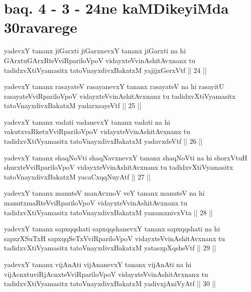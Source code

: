 \section*{baq. 4 - 3 - 24ne kaMDikeyiMda 30ravarege}

\begin{shl}
yadevxY tananx jiGarxti jiGarxnevxY tananx jiGarxti na hi GArxtuGArxRteVviRpariloVpoV vidayxteV\s vinAshitAvxnanx tu tadidxvXtiVyamasitx tatoV\s nayxdivxBakatxM yajijxGerxVtf || 24 ||
\end{shl}

\begin{shl}
yadevxY tananx rasayateV rasayanevxY tananx rasayateV na hi rasayitU rasayateVviRpariloVpoV vidayxteV\s vinAshitAvxnanx tu tadidxvXtiVyamasitx tatoV\s nayxdivxBakatxM yadarxsayeVtf || 25 ||
\end{shl}

\begin{shl}
yadevxY tananx vadati vadanevxY tananx vadati na hi vakutxvaRketxVviRpariloVpoV vidayxteV\s vinAshitAvxnanx tu tadidxvXtiVyamasitx tatoV\s nayxdivxBakatxM yadavxdeVtf || 26 ||
\end{shl}

\begin{shl}
yadevxY tananx shaqNoVti shaqNavxnevxY tananx shaqNoVti na hi shorxVtuH shurxteVviRpariloVpoV vidayxteV\s vinAshitAvxnanx tu tadidxvXtiVyamasitx tatoV\s nayxdivxBakatxM yacaCxqqNuyAtf || 27 ||
\end{shl}

\begin{shl}
yadevxY tananx manuteV manAvxnoV veY tananx manuteV na hi manutxmaRteVviRpariloVpoV vidayxteV\s vinAshitAvxnanx tu tadidxvXtiVyamasitx tatoV\s nayxdivxBakatxM yanamxnivxVta || 28 ||
\end{shl}

\begin{shl}
yadevxY tananx sapxqqshati sapxqqshanevxY tananx sapxqqshati na hi sapxrXSuTxH sapxqqSeTxVviRpariloVpoV vidayxteV\s vinAshitAvxnanx tu tadidxvXtiVyamasitx tatoV\s nayxdivxBakatxM yatasxpXqsheVtf || 29 ||
\end{shl}

\begin{shl}
yadevxY tananx vijAnAti vijAnanevxY tananx vijAnAti na hi vijAcnxtuviRjAcnxteVviRpariloVpoV vidayxteV\s vinAshitAvxnanx tu tadidxvXtiVyamasitx tatoV\s nayxdivxBakatxM yadivxjAniVyAtf || 30 ||
\end{shl}


